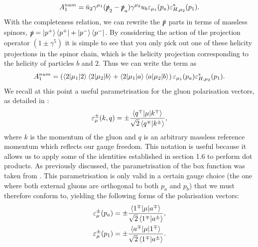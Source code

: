 \begin{equation}
A_1^{num} = \bar{u}_2 \gamma^{\mu_1}(\slashed{p}_2-\slashed{p}_a)\gamma^{\mu_2}u_b \varepsilon_{\mu_1}(p_a)\varepsilon^*_{H,\mu_2}(p_1).
\end{equation}
With the completeness relation, we can rewrite the $\slashed{p}$ parts in terms of massless spinors,  $\slashed{p} = \left| p^+ \right> \left<p^+ \right| + \left| p^- \right> \left<p^- \right|$. By considering the action of the projection operator $(1\pm \gamma^5)$ it is simple to see that you only pick out one of these helicity projections in the spinor chain, which is the helicity projection corresponding to the helicity of particles $b$ and $2$. Thus we can write the term as
\begin{equation}
A_1^{num} = \left(\mathinner{\langle2\vert\mu_1\vert2\rangle}_{}\mathinner{\langle2\vert\mu_2\vert b\rangle}_{} + \mathinner{\langle2\vert\mu_1\vert a\rangle}_{}\mathinner{\langle a\vert\mu_2\vert b\rangle}_{}\right)\varepsilon_{\mu_1}(p_a)\varepsilon^*_{H,\mu_2}(p_1).
\label{eqn:num}
\end{equation}
We recall at this point a useful parametrisation for the gluon polarisation vectors, as detailed in \cite{Dixon1996}:
\begin{equation}
\varepsilon_\mu^{\pm}(k,q) = \pm \frac{\mathinner{\langle q^\mp\vert\mu\vert k^\mp\rangle}_{}}{\sqrt{2} \left<q^\mp | k^\pm \right>},
\end{equation}
where $k$ is the momentum of the gluon and $q$ is an arbitrary massless reference momentum which reflects our gauge freedom. This notation is useful because it allows us to apply some of the identities established in section 1.6 to perform dot products. As previously discussed, the parametrisation of the box function was taken from \cite{Duca2003}. This parametrisation is only valid in a certain gauge choice (the one where both external gluons are orthogonal to both $p_a$ and $p_b$) that we must therefore conform to, yielding the following forms of the polarisation vectors:
\begin{equation}
\begin{split}
\varepsilon_\mu^{\pm}(p_a) &= \pm \frac{\mathinner{\langle1^\mp\vert\mu\vert a^\mp\rangle}_{}}{\sqrt{2} \left<1^\mp | a^\pm \right>}, \\
\varepsilon_\mu^{\pm}(p_1) &= \pm \frac{\mathinner{\langle a^\mp\vert\mu\vert1^\mp\rangle}_{}}{\sqrt{2} \left<1^\mp | a^\pm \right>}.
\end{split}
\end{equation}
